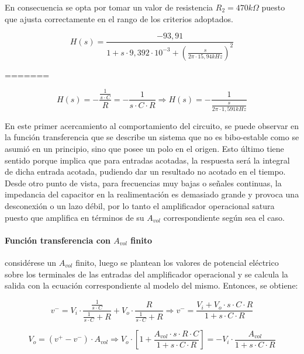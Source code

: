 En consecuencia se opta por tomar un valor de resistencia $R_2 = 470k\Omega$ puesto que ajusta correctamente en el rango de los criterios adoptados.

\begin{equation}
	H(s) = \frac{-93,91}{1 + s \cdot 9,392 \cdot 10^{-3} + \left( \frac{s}{2 \pi \cdot 15,94kHz} \right)^{2}}
\end{equation}

=======

\begin{equation}
	H(s) = - \frac{\frac{1}{s \cdot C}}{R} = - \frac{1}{s \cdot C \cdot R}
	\Rightarrow
	H(s) = - \frac{1}{\frac{s}{2 \pi \cdot 1,591kHz}}
	\label{eq:integrador_transfer_ideal}
\end{equation}

En este primer acercamiento al comportamiento del circuito, se puede observar en la funci\'on transferencia que se describe un sistema que no es bibo-estable como se asumi\'o en un principio, sino que posee un polo en el origen. Esto \'ultimo tiene sentido porque implica que para entradas acotadas, la respuesta ser\'a la integral de dicha entrada acotada, pudiendo dar un resultado no acotado en el tiempo. Desde otro punto de vista, para frecuencias muy bajas o se\~nales continuas, la impedancia del capacitor en la realimentaci\'on es demasiado grande y provoca una desconexi\'on o un lazo d\'ebil, por lo tanto el amplificador operacional satura puesto que amplifica en t\'erminos de su $A_{vol}$ correspondiente seg\'un sea el caso.

\paragraph*{Funci\'on transferencia con $A_{vol}$ finito} consid\'erese un $A_{vol}$ finito, luego se plantean los valores de potencial el\'ectrico sobre los terminales de las entradas del amplificador operacional y se calcula la salida con la ecuaci\'on correspondiente al modelo del mismo. Entonces, se obtiene:

\begin{equation*}
	v^{-} = V_i \cdot \frac{\frac{1}{s \cdot C}}{\frac{1}{s \cdot C} + R} + V_o \cdot \frac{R}{\frac{1}{s \cdot C} + R}
	\Rightarrow
	v^{-} = \frac{V_i + V_o \cdot s \cdot C \cdot R}{1 + s \cdot C \cdot R}
\end{equation*}

\begin{equation*}
	V_o = (v^{+} - v^{-}) \cdot A_{vol} \Rightarrow
	V_o \cdot \left[ 1 + \frac{A_{vol} \cdot s \cdot R \cdot C}{1 + s \cdot C \cdot R} \right] =
	- V_i \cdot \frac{A_{vol}}{1 + s \cdot C \cdot R}
\end{equation*}

